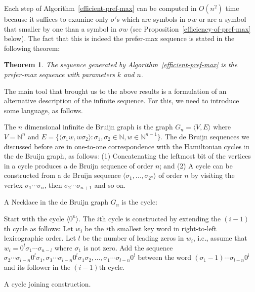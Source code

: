 \documentclass{article}
\newtheorem{theorem}{Theorem}
\theoremstyle{definition}
\newcommand{\N}{{\mathbb{N}}}
\newcommand{\T}[1]{\langle{#1}\rangle}
\begin{document}
Each step of Algorithm~\ref{efficient-pref-max} can be computed in $O(n^2)$ time because it suffices to examine only $\sigma'$s which are symbols in $\sigma w$ or are a symbol that smaller by one than a symbol in $\sigma w$ (see Proposition~\ref{efficiency-of-pref-max} below).
The fact that this is indeed the prefer-max sequence is stated in the following theorem:

\begin{theorem}
	The sequence generated by Algorithm~\ref{efficient-pref-max} is the prefer-max sequence with parameters $k$ and $n$.
\end{theorem}
	

The main tool that brought us to the above results is a formulation of an alternative description of the infinite sequence. For this, we need to introduce some language, as follows.

The $n$ dimensional infinite de Bruijn graph is the graph $G_{n}=\T{V,E}$ where $V=\N^n$ and $E=\{ \T{\sigma_1 w, w \sigma_2} \colon \sigma_1,\sigma_2\in\N, w \in \N^{n-1}\}$. The de Bruijn sequences we discussed before are in one-to-one correspondence with the Hamiltonian cycles in the de Bruijn graph, as follows: (1) Concatenating the leftmost bit of the vertices in a cycle produces a de Bruijn sequence of order $n$; and (2) A cycle can be constructed from a de Bruijn sequence $\T{\sigma_1,\dots,\sigma_{2^n}}$ of order $n$ by visiting the vertex $\sigma_1\cdots\sigma_n$, then $\sigma_2\cdots\sigma_{n+1}$ and so on.

A Necklace in the de Bruijn graph $G_n$ is the cycle:


\begin{algorithm}[!h]
	Start with the cycle $\T{0^n}$. The $i$th cycle is constructed by extending the $(i-1)$th cycle as follows: Let $w_i$ be the $i$th smallest key word in right-to-left lexicographic order. Let $l$ be the number of leading zeros in $w_i$, i.e., assume that $w_i=0^l\sigma_1 \cdots\sigma_{n-l}$ where $\sigma_1$ is not zero. Add the sequence $\sigma_2\cdots\sigma_{l-n}0^l\sigma_1, \sigma_3\cdots\sigma_{l-n}0^l\sigma_1\sigma_2,\dots, \sigma_1\cdots\sigma_{l-n}0^l$ between the word $(\sigma_1-1)\cdots\sigma_{l-n}0^l$ and its follower in the $(i-1)$th cycle.

	\caption{A cycle joining construction.}
	\label{cycle-joining}
\end{algorithm}






	
\end{document}

